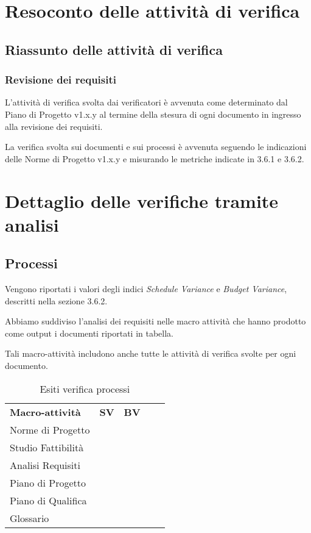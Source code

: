 \newpage
\appendix
\section{Resoconto delle attività di verifica} \label{App:AppendixA}
	\subsection{Riassunto delle attività di verifica} \label{App:AppendixA}
		\subsubsection{Revisione dei requisiti} \label{App:AppendixA}
			
			L'attività di verifica svolta dai verificatori è avvenuta come determinato dal Piano di Progetto v1.x.y al termine della stesura di ogni documento in ingresso alla revisione dei requisiti.
			
			La verifica svolta sui documenti e sui processi è avvenuta seguendo le indicazioni delle Norme di Progetto v1.x.y e misurando le metriche indicate in 3.6.1 e 3.6.2.
			
\section{Dettaglio delle verifiche tramite analisi} \label{App:AppendixB}
	\subsection{Processi} \label{App:AppendixB}
	
		Vengono riportati i valori degli indici \textit{Schedule Variance} e \textit{Budget Variance}, descritti nella sezione 3.6.2.
		
		Abbiamo suddiviso l'analisi dei requisiti nelle macro attività che hanno prodotto come output i documenti riportati in tabella. 
		
		Tali macro-attività includono anche tutte le attività di verifica svolte per ogni documento.
		
		\begin{table}[!ht]
			\centering
				\begin{tabular}{|l|l|l|ll}
					\cline{1-3}
					 \textbf{Macro-attività}  & \textbf{SV}  & \textbf{BV}  &  \\ \cline{1-3}
					 Norme di Progetto  &  &  &  \\ \cline{1-3}
					 Studio Fattibilità &  &  &  \\ \cline{1-3}
					 Analisi Requisiti &  &  &  \\ \cline{1-3}
					 Piano di Progetto &  &  &  \\ \cline{1-3}
					 Piano di Qualifica &  &  &  \\ \cline{1-3}
					 Glossario &  &  &  \\ \cline{1-3}
				\end{tabular}
				\caption{Esiti verifica processi}
		\end{table}
		
